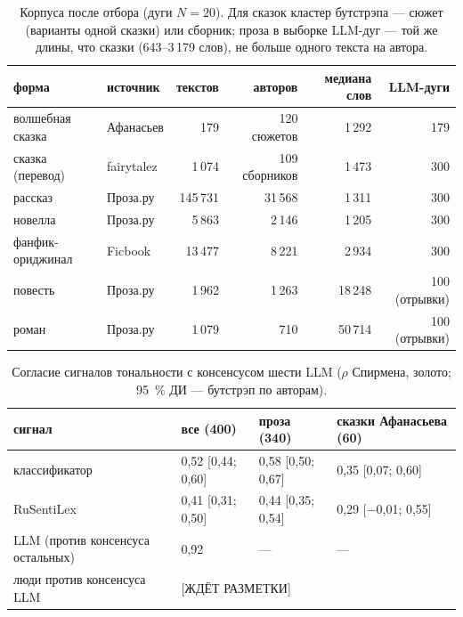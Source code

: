 
\begin{table}[t]
\centering\small
\caption{Корпуса после отбора (дуги $N = 20$). Для сказок кластер бутстрэпа — сюжет (варианты одной сказки) или сборник;
проза в выборке LLM-дуг — той же длины, что сказки (643--3\,179 слов), не больше одного текста на автора.}
\label{tab:corpora}
\begin{tabular}{llrrrr}
\toprule
форма & источник & текстов & авторов & медиана слов & LLM-дуги \\
\midrule
волшебная сказка & Афанасьев & 179 & 120 сюжетов & 1\,292 & 179 \\
сказка (перевод) & fairytalez & 1\,074 & 109 сборников & 1\,473 & 300 \\
рассказ & Проза.ру & 145\,731 & 31\,568 & 1\,311 & 300 \\
новелла & Проза.ру & 5\,863 & 2\,146 & 1\,205 & 300 \\
фанфик-ориджинал & Ficbook & 13\,477 & 8\,221 & 2\,934 & 300 \\
повесть & Проза.ру & 1\,962 & 1\,263 & 18\,248 & 100 (отрывки) \\
роман & Проза.ру & 1\,079 & 710 & 50\,714 & 100 (отрывки) \\
\bottomrule
\end{tabular}
\end{table}

\begin{table}[t]
\centering\small
\caption{Согласие сигналов тональности с консенсусом шести LLM ($\rho$ Спирмена, золото; 95~\% ДИ — бутстрэп по авторам).}
\label{tab:validation}
\begin{tabular}{llll}
\toprule
сигнал & все (400) & проза (340) & сказки Афанасьева (60) \\
\midrule
классификатор & 0,52 [0,44; 0,60] & 0,58 [0,50; 0,67] & 0,35 [0,07; 0,60] \\
RuSentiLex & 0,41 [0,31; 0,50] & 0,44 [0,35; 0,54] & 0,29 [$-$0,01; 0,55] \\
LLM (против консенсуса остальных) & 0,92 & --- & --- \\
люди против консенсуса LLM & \multicolumn{3}{l}{[ЖДЁТ РАЗМЕТКИ]} \\
\bottomrule
\end{tabular}
\end{table}

